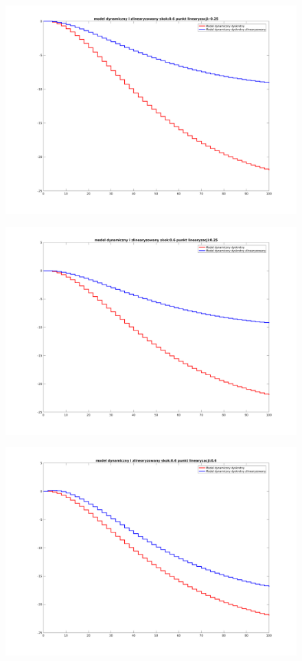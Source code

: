 \documentclass[a4paper, 11pt]{article}
\begin{document}
\begin{figure}[H]
\centering
\includegraphics[scale=0.45]{96m25.png}
\end{figure}
\begin{figure}[H]
\centering
\includegraphics[scale=0.45]{9625.png}
\end{figure}
\begin{figure}[H]
\centering
\includegraphics[scale=0.45]{966.png}
\end{figure}
\end{document}
